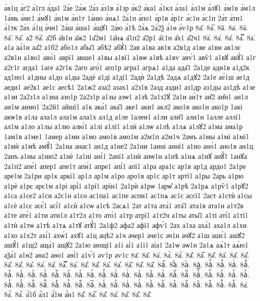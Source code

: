 {а́в1ц
а́г2
а́1гл
а́да1
2а́е
2а́ж
2а́з
а́з1в
а́1зр
а́к2
а́ка1
а́1кл
а́ла1
а́л1м
а́лꙋ1
а́м1в
а́м1л
1а́мь
а́мє1
а́мꙋ1
а́н1м
а́н1т
1а́ню
а́нѧ1
2а́1п
а́по1
а́р1в
а́р1г
а́с1н
а́с1п
2а́т
а́ти1
а́1тк
2а́х
а́1ц
а́чи1
2а́ш
а́ша1
а́щꙋ1
2а́ю
а́1ѣ
2а́ѧ
2а́2ѯ
а́1ѳ
а́ѵ1р
8а̂.
8а̅.
8ӑ.
8а̇.
8ӓ.
8а̋.
8а̏.
а2̑
8а̑.
а̑2б
а̑в1н
а̑ж2
1а̑2м1
1а̑нѧ
а̑1п2
а̑2р1
а̑с1н
а̑х1
а̑2ч1
8а̓.
8а̔.
8а̾.
8а̿.
8а͘.
а1а
аа́1н
аа̑2
а1б2
або1л
абы̑1
абѣ2
абꙋ́1
2ав
а1ва
ав1в
а2в1д
а1ве
а1ви
ав1лє
а2в1н
а1во1
аво́1
аврї1
авше1
а1вы
а1вї1
а1вѡ
а1вѣ
а1вѵ
авѵ́1
авѷ1
а1вꙋ
авꙋ́1
а1г
а2г1г
агда1
1аге
а2г1к
2аго
аго́1
аго1р
агра1
агрѧ1
а1да
ада̑1
2а1де
ади1в
а1д2к
ад1но1
а1дны
а1до
а1ды
2адѐ
а1ді
а1дї1
2адѝ
2а1дѣ
2адѧ
а1дꙋ2
2а1е
ае́1ш
ае1д
аеди1
ае2к1
ае1с
аесѣ1
2а1ж2
аза2
азах1
а2з1в
2азд
азди1
аз1др
аз1ды
аз1дѣ
а1зе
а1зи
2а2з1л
а1зна
азо1р
2а2з1р
а1зы
азѡ1
а1зѣ
2а1з2ꙋ
2а1и
аи́1т
аи̑2
аи̑н1
аи1л
аи1м
аимо1
2а2й1
айшї1
а1к
ака́1
ака̑1
аке1
аки1
акл2
ако1в
ако1н
ако1р
1акі
акѡ1в
а1ла
ала1л
ала1м
ала1х
ал1д
а1ле
1ален1
а1ли
али̑1
али1н
1алле
аллї1
ал1м
а1ло
а1лы
а1лю
алю́1
а1лі
а1лї1
а1лѝ
а1лѡ
а1лѣ
а1лѧ
а1лꙋ2
а1ма
ама1р
1ам1в
а1ме1
1амер
а1ми
а1мо
амо1в
амо1м
а2м1п
а2м1ч
2амъ
а1мы
а1мі
а1мї1
а1мѝ
а1мѣ
амꙋ́1
2а1на
анас1
ан1д
а1не2
2а1ни
1анні
аннї1
а1но
ано́1
ано1в
ан1ц
2анъ
а1ны
а1ню2
а1нѐ
1а1ні
ані́1
2анї1
а1нѝ
анѡ1н
а1нѣ
а1нѧ
а1нꙋ
анꙋ́1
1анꙋа
2а1п2
апе́1
апер1
апе1т
апи́1
апре1
апі́1
апї1
а1ра
ара1с
ар1в
ар1д
ардо1
2а1ре
аре1м
2а1ри
ар1к
аркї1
ар1л
ар1м
а1ро
аро1в
ар1с
ар1т
артї1
а1ры
2арь
а1рю
а1рѐ
а1рє
арє1м
а1рі
арі́1
а1рї1
арїи1
2а1рѝ
а1рѡ
1арѡ̑
а1рѣ
2а1рѧ
а1рѷ1
а1рꙋ2
а1са
а1се2
а1си
а2с1н
а1со
ас1па1
ас1пе
аспи1
ас1пѧ
ас1с
ассї1
2аст
а1стѝ
а1сы
а1сѐ
а1сє
асє́1
асі́1
а1сѝ
а1сѡ
а1сѣ
2асѧ1
2ат
а1та
ата́1
ата̑1
ата1в
ата1н
а1т2в
а1те
ате́1
а1ти
ати1л
а1т2л
а1то
ато́1
а1тр
атрї1
а1т2ч
а1ты
аты̑1
а1ті
аті́1
а1тї1
а1тѝ
а1тѡ
а1тѣ
а1тѧ
а1тꙋ
атꙋ́1
2а1ф2
афа2
афї1
афѵ́1
2ах
а1ха
аха́1
аха1л
а1хи
а1хо
а1х2т
ахі́1
ахѡ́1
ахꙋ1
а1ц
ацѣ2
а1ч
ачер1
аче1с
ач1н
ачꙋ2
а1ш
ашє́1
ашꙋ2
ашꙋ́1
а1щ2
аща́1
ащꙋ2
2а1ю
ающї1
а1і
аі́1
а1ї1
аїа1
2а1ѡ
аѡ1н
2а1ѧ
аѧ́1т
аѧ́ю1
аѯа́1
а1ѳ2
аѳа2
аѳо1
аѳі́1
а1ѵ́1
аѵ1р
аѵ1с
8а҃.
8а҄.
8а҅.
8а҅̀.
8а҅́.
8а҅̂.
8а҅̅.
8а҅̆.
8а҅̇.
8а҅̈.
8а҅̋.
8а҅̏.
8а҅̑.
8а҅̓.
8а҅̔.
8а҅̾.
8а҅̿.
8а҅͘.
8а҅҃.
8а҅҄.
8а҅҅.
8а҅҆.
8а҅҇.
8а҅᷀.
8а҅᷁.
8а҅᷶.
8а᷷҅.
8а᷸҅.
8а᷹҅.
8а҅ⷠ.
8а҅ⷡ.
8а҅ⷢ.
8а҅ⷣ.
8а҅ⷤ.
8а҅ⷥ.
8а҅ⷦ.
8а҅ⷧ.
8а҅ⷨ.
8а҅ⷩ.
8а҅ⷪ.
8а҅ⷫ.
8а҅ⷬ.
8а҅ⷭ.
8а҅ⷮ.
8а҅ⷯ.
8а҅ⷰ.
8а҅ⷱ.
8а҅ⷲ.
8а҅ⷳ.
8а҅ⷴ.
8а҅ⷵ.
8а҅ⷶ.
8а҅ⷷ.
8а҅ⷸ.
8а҅ⷹ.
8а҅ⷺ.
8а҅ⷻ.
8а҅ⷼ.
8а҅ⷽ.
8а҅ⷾ.
8а҅ⷿ.
8а҅꙯.
8а҅ꙴ.
8а҅ꙵ.
8а҅ꙶ.
8а҅ꙷ.
8а҅ꙸ.
8а҅ꙹ.
8а҅ꙺ.
8а҅ꙻ.
8а҅꙼.
8а҅꙽.
8а҅ꚞ.
8а҅ꚟ.
8а҆.
8а҆̀.
8а҆́.
а҆́1б
а҆́л1
а҆́1м
а҆́н1
8а҆̂.
8а҆̅.
8а҆̆.
8а҆̇.
8а҆̈.
8а҆̋.
8а҆̏.
}
